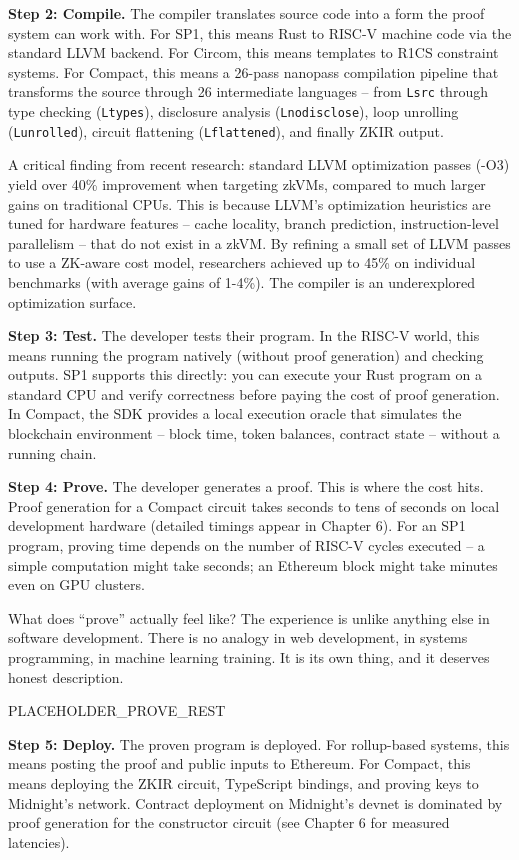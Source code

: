 \documentclass[
  11pt,
  openany]{report}
\renewcommand{\textbf}[1]{{\bfseries\color{MidnightBold}#1}}
\begin{document}
\textbf{Step 2: Compile.} The compiler translates source code into a form the
proof system can work with. For SP1, this means Rust to RISC-V machine code via
the standard LLVM backend. For Circom, this means templates to R1CS constraint
systems. For Compact, this means a 26-pass nanopass compilation pipeline that
transforms the source through 26 intermediate languages -- from \texttt{Lsrc}
through type checking (\texttt{Ltypes}), disclosure analysis
(\texttt{Lnodisclose}), loop unrolling (\texttt{Lunrolled}), circuit flattening
(\texttt{Lflattened}), and finally ZKIR output.

A critical finding from recent research: standard LLVM optimization passes (-O3)
yield over 40\% improvement when targeting zkVMs, compared to much larger gains
on traditional CPUs. This is because LLVM's optimization heuristics are tuned
for hardware features -- cache locality, branch prediction, instruction-level
parallelism -- that do not exist in a zkVM. By refining a small set of LLVM
passes to use a ZK-aware cost model, researchers achieved up to 45\% on
individual benchmarks (with average gains of 1-4\%). The compiler is an
underexplored optimization surface.

\textbf{Step 3: Test.} The developer tests their program. In the RISC-V world,
this means running the program natively (without proof generation) and checking
outputs. SP1 supports this directly: you can execute your Rust program on a
standard CPU and verify correctness before paying the cost of proof generation.
In Compact, the SDK provides a local execution oracle that simulates the
blockchain environment -- block time, token balances, contract state -- without
a running chain.

\textbf{Step 4: Prove.} The developer generates a proof. This is where the cost
hits. Proof generation for a Compact circuit takes seconds to tens of seconds on
local development hardware (detailed timings appear in Chapter 6). For an SP1
program, proving time depends on the number of RISC-V cycles executed -- a
simple computation might take seconds; an Ethereum block might take minutes even
on GPU clusters.

What does ``prove'' actually feel like? The experience is unlike anything else
in software development. There is no analogy in web development, in systems
programming, in machine learning training. It is its own thing, and it deserves
honest description.

PLACEHOLDER\_PROVE\_REST

\textbf{Step 5: Deploy.} The proven program is deployed. For rollup-based
systems, this means posting the proof and public inputs to Ethereum. For
Compact, this means deploying the ZKIR circuit, TypeScript bindings, and proving
keys to Midnight's network. Contract deployment on Midnight's devnet is
dominated by proof generation for the constructor circuit (see Chapter 6 for
measured latencies).
\end{document}
